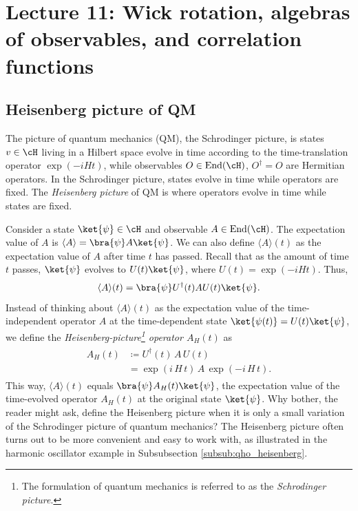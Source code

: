 \newpage
\section{Lecture 11: Wick rotation, algebras of observables, and correlation functions}

\subsection{Heisenberg picture of QM}

The  picture of quantum mechanics (QM), the Schrodinger picture, is states $v \in \cH$ living in a Hilbert space evolve in time according to the time-translation operator $\exp(-i H t)$, while observables $O \in \text{End}(\cH)$, $O^\dag = O$ are Hermitian operators. In the Schrodinger picture, states evolve in time while operators are fixed. The \emph{Heisenberg picture} of QM is where operators evolve in time while states are fixed.

Consider a state $\ket{\psi} \in \cH$ and observable $A \in \text{End}(\cH)$. The expectation value of $A$ is $\langle A \rangle = \bra{\psi} A \ket{\psi}$. We can also define $\langle A \rangle(t)$ as the expectation value of $A$ after time $t$ has passed. Recall that as the amount of time $t$ passes, $\ket{\psi}$ evolves to $U(t) \ket{\psi}$, where $U(t) = \exp(-i H t)$. Thus,
\begin{equation*}
    \langle A \rangle(t) = \bra{\psi} U^\dag(t) A U(t) \ket{\psi}.
\end{equation*}
Instead of thinking about $\langle A \rangle(t)$ as the expectation value of the time-independent operator $A$ at the time-dependent state $\ket{\psi(t)} = U(t) \ket{\psi}$, we define the \emph{Heisenberg-picture\footnote{The  formulation of quantum mechanics is referred to as the \emph{Schrodinger picture}.} operator $A_H(t)$} as
\begin{align} \begin{split} \label{eq:heisenberg_operator_defn}
    A_H(t) &\coloneqq U^\dag(t) \, A \, U(t)\\
        &= \exp(i \, H \, t) \, A \, \exp(-i \, H \, t).
\end{split} \end{align}
This way, $\langle A \rangle(t)$ equals $\bra{\psi} A_H(t) \ket{\psi}$, the expectation value of the time-evolved operator $A_H(t)$ at the original state $\ket{\psi}$. Why bother, the reader might ask, define the Heisenberg picture when it is only a small variation of the Schrodinger picture of quantum mechanics? The Heisenberg picture often turns out to be more convenient and easy to work with, as illustrated in the harmonic oscillator example in Subsubsection \ref{subsub:qho_heisenberg}.

